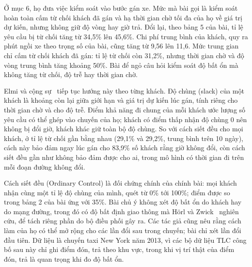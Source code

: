Ở mục 6, họ đưa việc kiểm soát vào bước gán xe. Mức mà bài gọi là kiểm soát hoàn toàn cấm từ chối khách đã gán và
hạ thời gian chờ tối đa của họ về giá trị dự kiến, nhưng không giữ độ vòng hay giờ trả. Đổi lại, theo bảng 5 của bài,
tỉ lệ yêu cầu bị từ chối tăng từ 34,5\% lên 45,6\%. Chi phí trung bình của khách, quy ra phút ngồi xe theo trọng số của
bài, cũng tăng từ 9,56 lên 11,6. Mức trung gian chỉ cấm từ chối khách đã gán: tỉ lệ từ chối còn 31,2\%, nhưng
thời gian chờ và độ vòng trung bình tăng khoảng 50\%. Bài để ngỏ câu hỏi kiểm soát độ bất ổn mà không tăng từ chối,
độ trễ hay thời gian chờ.

Elmi và cộng sự~\cite{elmi2026} tiếp tục hướng này theo từng khách. Độ chùng (slack) của một khách là khoảng còn lại
giữa giới hạn và giá trị dự kiến lúc gán, tính riêng cho thời gian chờ và cho độ trễ. Điểm khả năng đi chung của mỗi
khách ước lượng số yêu cầu có thể ghép vào chuyến của họ; khách có điểm thấp nhận độ chùng 0 nên không bị đổi giờ,
khách khác giữ toàn bộ độ chùng. So với cách siết đều cho mọi khách, ở tỉ lệ từ chối gần bằng nhau (29,1\% và 29,2\%,
trung bình trên 10 ngày), cách này bảo đảm ngay lúc gán cho 83,9\% số khách rằng giờ không đổi, còn cách siết đều gần
như không bảo đảm được cho ai, trong mô hình có thời gian đi trên mỗi đoạn đường không đổi.

Cách siết đều (Ordinary Control) là đối chứng chính của chính bài: mọi khách nhận cùng một tỉ lệ độ chùng của mình,
quét từ 0\% tới 100\%; điểm được so trong bảng 2 của bài ứng với 35\%. Bài chủ ý không xét độ bất ổn do khách hay do
mạng đường, trong đó có độ bất định giao thông mà Hörl và Zwick~\cite{horl2022} nghiên cứu, để tách riêng phần do bộ
điều phối gây ra. Các tác giả cũng nêu rằng cách làm của họ có thể mở rộng cho các lần đổi sau trong chuyến; bài chỉ
xét lần đổi đầu tiên. Dữ liệu là chuyến taxi New York năm 2013, vì các bộ dữ liệu TLC công bố sau này chỉ ghi điểm
đón, trả theo khu vực, trong khi vị trí thật của điểm đón, trả là quan trọng khi đo độ bất ổn.

